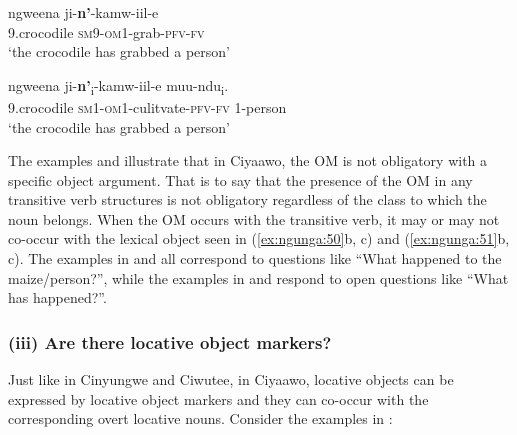 \documentclass[output=paper]{langscibook}
\begin{document}
\ex\label{ex:ngunga:51b} \gll ngweena    ji-\textbf{n’}{}-kamw-iil-e\\
  {\textsc{}9}.crocodile    {\textsc{sm}9\textsc{}-\textsc{om}1-}grab-{\textsc{pfv}-\textsc{fv}}  \\
\glt  ‘the crocodile has grabbed a person’  

\ex\label{ex:ngunga:51c} \gll ngweena    ji-\textbf{n’}\textsubscript{i}{}-kamw-iil-e    muu-ndu\textsubscript{i}.\\
  {\textsc{}9}.crocodile    {\textsc{sm}1\textsc{}-\textsc{om}1}{}-culitvate-{\textsc{pfv}-\textsc{fv}}  {1}{}-person\\
\glt  ‘the crocodile has grabbed a person’    
\z
\z

The examples  and  illustrate that in Ciyaawo, the OM is not obligatory with a specific object argument. That is to say that the presence of the OM in any transitive verb structures is not obligatory regardless of the class to which the noun belongs. When the OM occurs with the transitive verb, it may or may not co-occur with the lexical object seen in (\ref{ex:ngunga:50}b, c) and (\ref{ex:ngunga:51}b, c). The examples in  and  all correspond to questions like “What happened to the maize/person?”, while the examples in  and  respond to open questions like “What has happened?”. 

\subsubsection{(iii) Are there locative object markers?}

Just like in Cinyungwe and Ciwutee, in Ciyaawo, locative objects can be expressed by locative object markers and they can co-occur with the corresponding overt locative nouns. Consider the examples in : 

\ea\label{ex:ngunga:52}

\end{document}
